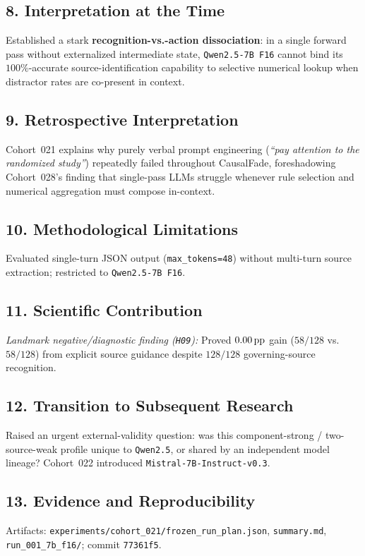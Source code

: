 \subsection*{8. Interpretation at the Time}
Established a stark \textbf{recognition-vs.-action dissociation}: in a single forward pass without externalized intermediate state, \texttt{Qwen2.5-7B F16} cannot bind its $100\%$-accurate source-identification capability to selective numerical lookup when distractor rates are co-present in context.

\subsection*{9. Retrospective Interpretation}
Cohort~021 explains why purely verbal prompt engineering (\emph{``pay attention to the randomized study''}) repeatedly failed throughout CausalFade, foreshadowing Cohort~028's finding that single-pass LLMs struggle whenever rule selection and numerical aggregation must compose in-context.

\subsection*{10. Methodological Limitations}
Evaluated single-turn JSON output (\texttt{max\_tokens=48}) without multi-turn source extraction; restricted to \texttt{Qwen2.5-7B F16}.

\subsection*{11. Scientific Contribution}
\emph{Landmark negative/diagnostic finding (\texttt{H09}):} Proved $0.00\,\mathrm{pp}$ gain ($58/128$ vs.\ $58/128$) from explicit source guidance despite $128/128$ governing-source recognition.

\subsection*{12. Transition to Subsequent Research}
Raised an urgent external-validity question: was this component-strong / two-source-weak profile unique to \texttt{Qwen2.5}, or shared by an independent model lineage? Cohort~022 introduced \texttt{Mistral-7B-Instruct-v0.3}.

\subsection*{13. Evidence and Reproducibility}
Artifacts: \texttt{experiments/cohort\_021/frozen\_run\_plan.json}, \texttt{summary.md}, \texttt{run\_001\_7b\_f16/}; commit \texttt{77361f5}.

